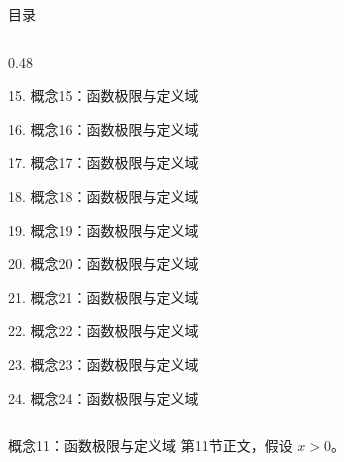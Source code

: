 \documentclass[aspectratio=169,10pt,fontset=fandol]{ctexbeamer}
\begin{document}
\begin{frame}[t,fragile]{目录}
\begin{columns}[T,onlytextwidth]
\begin{column}{0.48\textwidth}
{\color{gray!40}\small 15. 概念15：函数极限与定义域\par}\vspace{0.22em}
{\color{gray!40}\small 16. 概念16：函数极限与定义域\par}\vspace{0.22em}
{\color{gray!40}\small 17. 概念17：函数极限与定义域\par}\vspace{0.22em}
{\color{gray!40}\small 18. 概念18：函数极限与定义域\par}\vspace{0.22em}
{\color{gray!40}\small 19. 概念19：函数极限与定义域\par}\vspace{0.22em}
{\color{gray!40}\small 20. 概念20：函数极限与定义域\par}\vspace{0.22em}
{\color{gray!40}\small 21. 概念21：函数极限与定义域\par}\vspace{0.22em}
{\color{gray!40}\small 22. 概念22：函数极限与定义域\par}\vspace{0.22em}
{\color{gray!40}\small 23. 概念23：函数极限与定义域\par}\vspace{0.22em}
{\color{gray!40}\small 24. 概念24：函数极限与定义域\par}\vspace{0.22em}
\end{column}
\end{columns}
\end{frame}
\begin{frame}[t,fragile]{概念11：函数极限与定义域}
\normalsize
{\normalsize
第11节正文，假设 $x>0$。
}
\end{frame}
\end{document}
